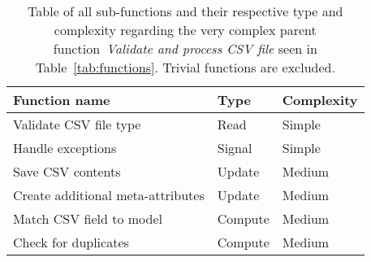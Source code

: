 \begin{table}[h]
    \begin{tabularx}{\textwidth}{ l X X }
        \toprule
        \textbf{Function name}
        & \textbf{Type}
        & \textbf{Complexity}
        \\ \midrule
        Validate CSV file type
        & Read
        & Simple
        \\ \midrule
        Handle exceptions
        & Signal
        & Simple
        \\ \midrule
        Save CSV contents
        & Update
        & Medium
        \\ \midrule
        Create additional meta-attributes
        & Update
        & Medium
        \\ \midrule
        Match CSV field to model
        & Compute
        & Medium
        \\ \midrule
        Check for duplicates
        & Compute
        & Medium
        \\ \bottomrule
    \end{tabularx}
    \caption{Table of all sub-functions and their respective type and complexity regarding the very complex parent
    function~\textit{Validate and process CSV file} seen in Table~\ref{tab:functions}.
    Trivial functions are excluded.
    }\label{tab:functions-validate-and-process-csv-file}
\end{table}

